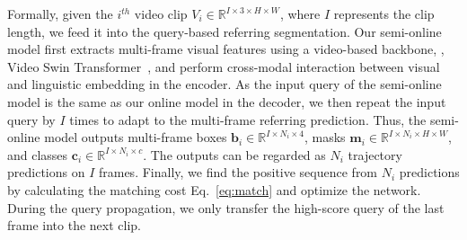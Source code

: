 \documentclass[10pt,twocolumn,letterpaper]{article}
\begin{document}
Formally, given the $i^{th}$ video clip $V_i\! \in \!\mathbb{R}^{I \times 3 \times H \times W}$, where $I$ represents the clip length, we feed it into the query-based referring segmentation. 
Our semi-online model first extracts multi-frame visual features using a video-based backbone, \ie, Video Swin Transformer~\cite{videoswin}, and perform cross-modal interaction between visual and linguistic embedding in the encoder.
As the input query of the semi-online model is the same as our online model in the decoder, we then repeat the input query by $I$ times to adapt to the multi-frame referring prediction.
Thus, the semi-online model outputs  multi-frame boxes $\bm{b}_i\!\in\!\mathbb{R}^{I \times N_i \times 4}$,  masks $\bm{m}_i\!\in\!\mathbb{R}^{I \times N_i \times H \times W}$, and classes $\bm{c}_i\!\in\!\mathbb{R}^{I \times N_i \times c}$.
The outputs can be regarded as $N_i$ trajectory predictions on $I$ frames.
Finally, we find the positive sequence from $N_i$ predictions by calculating the matching cost Eq.~\ref{eq:match} and optimize the network.
During the query propagation, we only transfer the high-score query of the last frame into the next clip.
\end{document}
